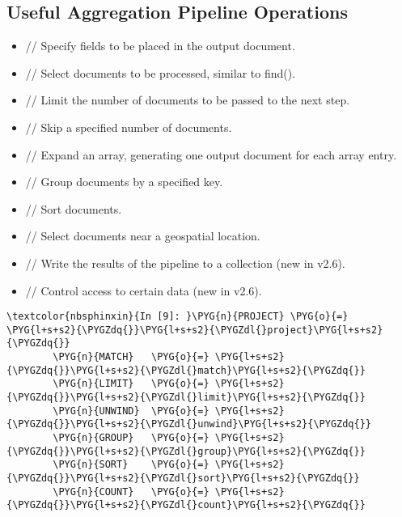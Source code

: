\documentclass[letterpaper,10pt,english]{sphinxmanual}
\begin{document}
\subsection{Useful Aggregation Pipeline Operations}
\label{\detokenize{04-mongo/04-02-pipelines:Useful-Aggregation-Pipeline-Operations}}\begin{itemize}
\item {} 
 // Specify fields to be placed in the output document.

\item {} 
 // Select documents to be processed, similar to find().

\item {} 
 // Limit the number of documents to be passed to the next
step.

\item {} 
 // Skip a specified number of documents.

\item {} 
 // Expand an array, generating one output document for
each array entry.

\item {} 
 // Group documents by a specified key.

\item {} 
 // Sort documents.

\item {} 
 // Select documents near a geospatial location.

\item {} 
 // Write the results of the pipeline to a collection (new in
v2.6).

\item {} 
 // Control access to certain data (new in v2.6).

\end{itemize}

%
\begin{Verbatim}[commandchars=\\\{\}]
\textcolor{nbsphinxin}{In [9]: }\PYG{n}{PROJECT} \PYG{o}{=} \PYG{l+s+s2}{\PYGZdq{}}\PYG{l+s+s2}{\PYGZdl{}project}\PYG{l+s+s2}{\PYGZdq{}}
        \PYG{n}{MATCH}   \PYG{o}{=} \PYG{l+s+s2}{\PYGZdq{}}\PYG{l+s+s2}{\PYGZdl{}match}\PYG{l+s+s2}{\PYGZdq{}}
        \PYG{n}{LIMIT}   \PYG{o}{=} \PYG{l+s+s2}{\PYGZdq{}}\PYG{l+s+s2}{\PYGZdl{}limit}\PYG{l+s+s2}{\PYGZdq{}}
        \PYG{n}{UNWIND}  \PYG{o}{=} \PYG{l+s+s2}{\PYGZdq{}}\PYG{l+s+s2}{\PYGZdl{}unwind}\PYG{l+s+s2}{\PYGZdq{}}
        \PYG{n}{GROUP}   \PYG{o}{=} \PYG{l+s+s2}{\PYGZdq{}}\PYG{l+s+s2}{\PYGZdl{}group}\PYG{l+s+s2}{\PYGZdq{}}
        \PYG{n}{SORT}    \PYG{o}{=} \PYG{l+s+s2}{\PYGZdq{}}\PYG{l+s+s2}{\PYGZdl{}sort}\PYG{l+s+s2}{\PYGZdq{}}
        \PYG{n}{COUNT}   \PYG{o}{=} \PYG{l+s+s2}{\PYGZdq{}}\PYG{l+s+s2}{\PYGZdl{}count}\PYG{l+s+s2}{\PYGZdq{}}
\end{Verbatim}
\end{document}
